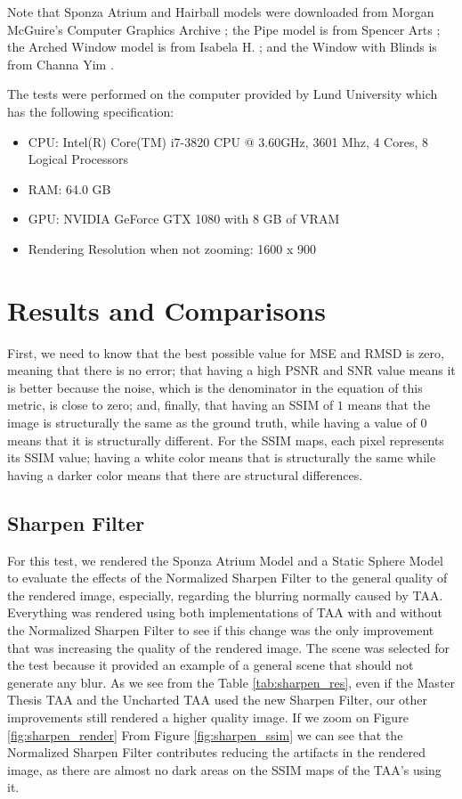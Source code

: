 \documentclass[pregrado]{tesis-usb} %
\begin{document}
Note that Sponza Atrium and Hairball models were downloaded from Morgan McGuire's Computer Graphics Archive \cite{McGuire2017Data}; the Pipe model is from Spencer Arts \cite{Spencer2010}; the Arched Window model is from Isabela H. \cite{Isabela2016}; and the Window with Blinds is from Channa Yim \cite{Channa2015}.

The tests were performed on the computer provided by Lund University which has the following specification:
\begin{itemize}
\setlength\itemsep{0em}
\item CPU: Intel(R) Core(TM) i7-3820 CPU @ 3.60GHz, 3601 Mhz, 4 Cores, 8 Logical Processors
\item RAM: 64.0 GB	
\item GPU: NVIDIA GeForce GTX 1080 with 8 GB of VRAM
\item Rendering Resolution when not zooming: 1600 x 900
\end{itemize}

\section{Results and Comparisons}
First, we need to know that the best possible value for MSE and RMSD is zero, meaning that there is no error; that having a high PSNR and SNR value means it is better because the noise, which is the denominator in the equation of this metric, is close to zero; and, finally, that having an SSIM of $1$ means that the image is structurally the same as the ground truth, while having a value of $0$ means that it is structurally different. For the SSIM maps, each pixel represents its SSIM value; having a white color means that is structurally the same while having a darker color means that there are structural differences.

\subsection{Sharpen Filter}
For this test, we rendered the Sponza Atrium Model and a Static Sphere Model to evaluate the effects of the Normalized Sharpen Filter to the general quality of the rendered image, especially, regarding the blurring normally caused by TAA. Everything was rendered using both implementations of TAA with and without the Normalized Sharpen Filter to see if this change was the only improvement that was increasing the quality of the rendered image. The scene was selected for the test because it provided an example of a general scene that should not generate any blur. As we see from the Table \ref{tab:sharpen_res}, even if the Master Thesis TAA and the Uncharted TAA used the new Sharpen Filter, our other improvements still rendered a higher quality image. If we zoom on Figure \ref{fig:sharpen_render} From Figure \ref{fig:sharpen_ssim} we can see that the Normalized Sharpen Filter contributes reducing the artifacts in the rendered image, as there are almost no dark areas on the SSIM maps of the TAA's using it.
\end{document}

